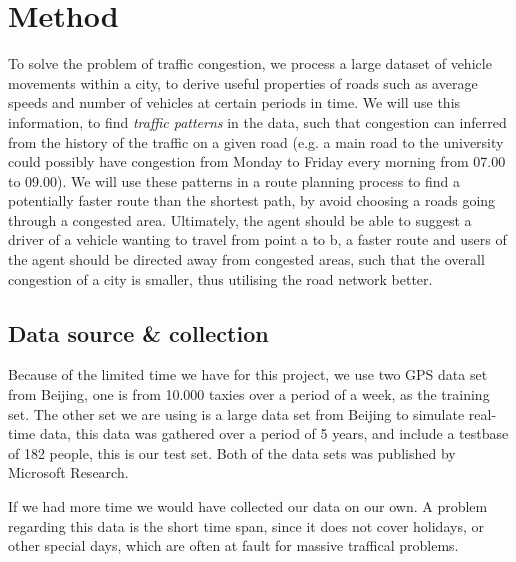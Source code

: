 \section{Method}
To solve the problem of traffic congestion, we process a large dataset of vehicle movements within a city, to derive useful properties of roads such as average speeds and number of vehicles at certain periods in time. We will use this information, to find \emph{traffic patterns} in the data, such that congestion can inferred from the history of the traffic on a given road (e.g. a main road to the university could possibly have congestion from Monday to Friday every morning from 07.00 to 09.00). We will use these patterns in a route planning process to find a potentially faster route than the shortest path, by avoid choosing a roads going through a congested area. Ultimately, the agent should be able to suggest a driver of a vehicle wanting to travel from point a to b, a faster route and users of the agent should be directed away from congested areas, such that the overall congestion of a city is smaller, thus utilising the road network better.

\subsection*{Data source \& collection}
Because of the limited time we have for this project, we use two GPS data set from Beijing, one is from 10.000 taxies over a period of a week, as the training set\cite{Tdrive}. The other set we are using is a large data set from Beijing to simulate real-time data, this data was gathered over a period of 5 years, and include a testbase of 182 people\cite{Geolife}, this is our test set. Both of the data sets was published by Microsoft Research.

If we had more time we would have collected our data on our own. A problem regarding this data is the short time span, since it does not cover holidays, or other special days, which are often at fault for massive traffical problems.






